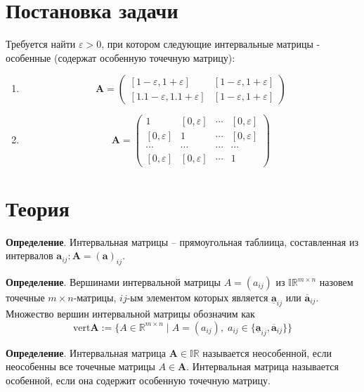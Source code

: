 \documentclass[14pt,a4paper,article]{ncc}
\begin{document}
\section{Постановка задачи}
Требуется найти $\varepsilon > 0$, при котором следующие интервальные
матрицы - особенные (содержат особенную точечную матрицу):
\begin{enumerate}
    \item 
    \begin{equation*}
    \textbf{A} = 
    \begin{pmatrix}
        [1 - \varepsilon, 1 + \varepsilon] & [1 - \varepsilon, 1 + \varepsilon] \\
        [1.1 - \varepsilon, 1.1 + \varepsilon] & [1 - \varepsilon, 1 + \varepsilon]
    \end{pmatrix}
    \end{equation*}
    
    \item 
    \begin{equation*}
    \textbf{A} = 
    \begin{pmatrix}
        1 & [0, \varepsilon] & \cdots & [0, \varepsilon] \\
        [0, \varepsilon] & 1 & \cdots & [0, \varepsilon] \\
        \cdots & \cdots & \cdots & \cdots \\
        [0, \varepsilon] & [0, \varepsilon] & \cdots & 1
    \end{pmatrix}
    \end{equation*}
\end{enumerate}

\section{Теория}
\textbf{Определение}. Интервальная матрицы -- прямоугольная таблиица, составленная из интервалов $\textbf{a}_{ij}: \textbf{A} = (\textbf{a})_{ij}$.


\textbf{Определение}. Вершинами интервальной матрицы $A = (a_{ij})$ из $\mathbb{IR}^{m\times n}$ назовем точечные $m \times n$-матрицы, $ij$-ым элементом которых
является $\underline{\textbf{a}}_{ij}$ или $\overline{\textbf{a}}_{ij}$. Множество вершин интервальной матрицы обозначим как 
$$ \text{vert} \textbf{A} := \{A \in \mathbb{R}^{m \times n}\;|\; A = (a_{ij}),\; a_{ij} \in \{\underline{\textbf{a}}_{ij}, \overline{\textbf{a}}_{ij}\}\} $$


\textbf{Определение}. Интервальная матрица $\textbf{A} \in \mathbb{IR}$ называется неособенной, если неособенны все точечные матрицы $A \in \textbf{A}$.
Интервальная матрица называется особенной, если она содержит особенную точечную матрицу.
\end{document}
